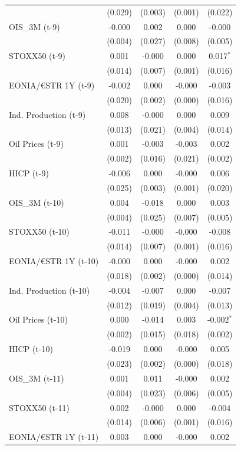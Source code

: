 \begin{longtable}[t]{lcccc}
 & (0.029) & (0.003) & (0.001) & (0.022)\\
OIS\_3M (t-9) & -0.000 & 0.002 & 0.000 & -0.000\\
 & (0.004) & (0.027) & (0.008) & (0.005)\\
STOXX50 (t-9) & 0.001 & -0.000 & 0.000 & 0.017$^{*}$\\
 & (0.014) & (0.007) & (0.001) & \vphantom{1} (0.016)\\
EONIA/€STR 1Y (t-9) & -0.002 & 0.000 & -0.000 & -0.003\\
 & (0.020) & (0.002) & (0.000) & (0.016)\\
Ind. Production (t-9) & 0.008 & -0.000 & 0.000 & 0.009\\
 & (0.013) & (0.021) & (0.004) & (0.014)\\
Oil Prices (t-9) & 0.001 & -0.003 & -0.003 & 0.002\\
 & (0.002) & (0.016) & (0.021) & (0.002)\\
HICP (t-9) & -0.006 & 0.000 & -0.000 & 0.006\\
 & (0.025) & (0.003) & (0.001) & (0.020)\\
OIS\_3M (t-10) & 0.004 & -0.018 & 0.000 & 0.003\\
 & (0.004) & (0.025) & (0.007) & (0.005)\\
STOXX50 (t-10) & -0.011 & -0.000 & -0.000 & -0.008\\
 & (0.014) & (0.007) & (0.001) & (0.016)\\
EONIA/€STR 1Y (t-10) & -0.000 & 0.000 & -0.000 & 0.002\\
 & (0.018) & (0.002) & (0.000) & (0.014)\\
Ind. Production (t-10) & -0.004 & -0.007 & 0.000 & -0.007\\
 & (0.012) & (0.019) & (0.004) & (0.013)\\
Oil Prices (t-10) & 0.000 & -0.014 & 0.003 & -0.002$^{*}$\\
 & (0.002) & (0.015) & (0.018) & (0.002)\\
HICP (t-10) & -0.019 & 0.000 & -0.000 & 0.005\\
 & (0.023) & (0.002) & (0.000) & (0.018)\\
OIS\_3M (t-11) & 0.001 & 0.011 & -0.000 & 0.002\\
 & (0.004) & (0.023) & (0.006) & (0.005)\\
STOXX50 (t-11) & 0.002 & -0.000 & 0.000 & -0.004\\
 & (0.014) & (0.006) & (0.001) & (0.016)\\
EONIA/€STR 1Y (t-11) & 0.003 & 0.000 & -0.000 & 0.002\\

\end{longtable}
